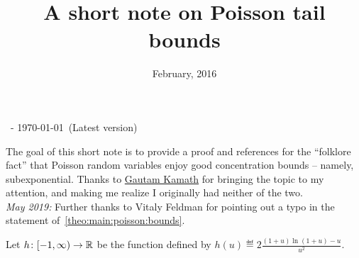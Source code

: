 \documentclass[10pt]{article}
\title{A short note on Poisson tail bounds}
\date{February, 2016}
\newcommand{\bennettfunc}{h}
\begin{document}
\begin{flushleft}\sf\footnotesize
\makeatletter
\@date~- \today~(Latest version) \hfill \@title
\makeatother
\end{flushleft}
\vspace{5mm}

The goal of this short note is to provide a proof and references for the ``folklore fact'' that Poisson random variables enjoy good concentration bounds -- namely, subexponential. Thanks to \href{http://www.gautamkamath.com/}{Gautam Kamath} for bringing the topic to my attention, and making me realize I originally had neither of the two.\\
\textit{May 2019:} Further thanks to Vitaly Feldman for pointing out a typo in the statement of~\autoref{theo:main:poisson:bounds}.\bigskip

\noindent Let $\bennettfunc\colon[-1,\infty) \to \R$ be the function defined by $h(u)\eqdef 2\frac{(1+u)\ln(1+u)-u}{u^2}$.
\end{document}
